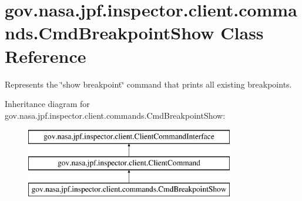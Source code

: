 \hypertarget{classgov_1_1nasa_1_1jpf_1_1inspector_1_1client_1_1commands_1_1_cmd_breakpoint_show}{}\section{gov.\+nasa.\+jpf.\+inspector.\+client.\+commands.\+Cmd\+Breakpoint\+Show Class Reference}
\label{classgov_1_1nasa_1_1jpf_1_1inspector_1_1client_1_1commands_1_1_cmd_breakpoint_show}


Represents the \char`\"{}show breakpoint\char`\"{} command that prints all existing breakpoints.  


Inheritance diagram for gov.\+nasa.\+jpf.\+inspector.\+client.\+commands.\+Cmd\+Breakpoint\+Show\+:\begin{figure}[H]
\begin{center}
\leavevmode
\includegraphics[height=3.000000cm]{classgov_1_1nasa_1_1jpf_1_1inspector_1_1client_1_1commands_1_1_cmd_breakpoint_show}
\end{center}
\end{figure}
